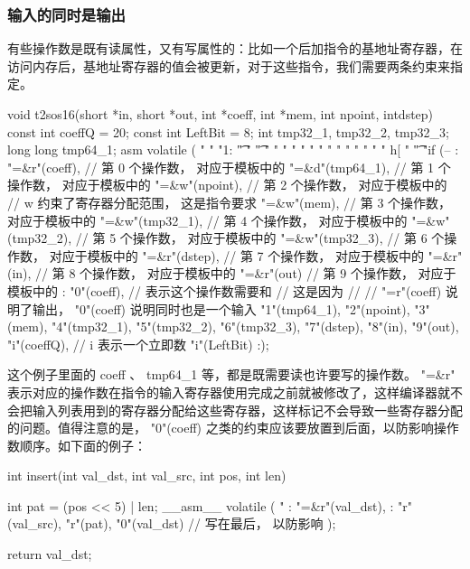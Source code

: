 \subsubsection{输入的同时是输出}
有些操作数是既有读属性，又有写属性的：比如一个后加指令的基地址寄存器，在访问内存后，基地址寄存器的值会被更新，对于这些指令，我们需要两条约束来指定。
\begin{myccode}
void t2sos16(short *in, short *out, int *coeff, int *mem, int npoint, intdstep) 
{
    const int coeffQ = 20;
    const int LeftBit = 8;
    int tmp32_1, tmp32_2, tmp32_3;
    long long tmp64_1;
    asm volatile (
    " %
    " %
    "1: \n\t"
    " \n\t"
    " %
    " %
    " %
    " %
    " %
    " %
    " %
    " %
    " %
    " %
    " %
    " %
    " %
    " h[%
    " \n\t"
    "if (--%
     : "=&r"(coeff), // 第 0 个操作数， 对应于模板中的 %
    "=&d"(tmp64_1), // 第 1 个操作数， 对应于模板中的 %
    "=&w"(npoint), // 第 2 个操作数， 对应于模板中的 %
    // w 约束了寄存器分配范围， 这是指令要求
    "=&w"(mem), // 第 3 个操作数， 对应于模板中的 %
    "=&w"(tmp32_1), // 第 4 个操作数， 对应于模板中的 %
    "=&w"(tmp32_2), // 第 5 个操作数， 对应于模板中的 %
    "=&w"(tmp32_3), // 第 6 个操作数， 对应于模板中的 %
    "=&r"(dstep), // 第 7 个操作数， 对应于模板中的 %
    "=&r"(in), // 第 8 个操作数， 对应于模板中的 %
    "=&r"(out) // 第 9 个操作数， 对应于模板中的 %
    : "0"(coeff), // 表示这个操作数需要和 %
    // 这是因为 %
    // %
    // "=r"(coeff) 说明了输出， "0"(coeff) 说明同时也是一个输入
    "1"(tmp64_1),
    "2"(npoint),
    "3"(mem),
    "4"(tmp32_1),
    "5"(tmp32_2),
    "6"(tmp32_3),
    "7"(dstep),
    "8"(in),
    "9"(out),
    "i"(coeffQ), // i 表示一个立即数
    "i"(LeftBit)
    :);
}
\end{myccode}

这个例子里面的 coeff 、 tmp64\_1 等，都是既需要读也许要写的操作数。 "=\&r" 表示对应的操作数在指令的输入寄存器使用完成之前就被修改了，这样编译器就不会把输入列表用到的寄存器分配给这些寄存器，这样标记不会导致一些寄存器分配的问题。值得注意的是， "0"(coeff) 之类的约束应该要放置到后面，以防影响操作数顺序。如下面的例子：
\begin{myccode}
int insert(int val_dst, int val_src, int pos, int len)
{
    int pat = (pos << 5) | len;
    __asm__ volatile (
    "%
    : "=&r"(val_dst),
    : "r"(val_src),
    "r"(pat),
    "0"(val_dst) // 写在最后， 以防影响 %
    );

    return val_dst;
}
\end{myccode}

